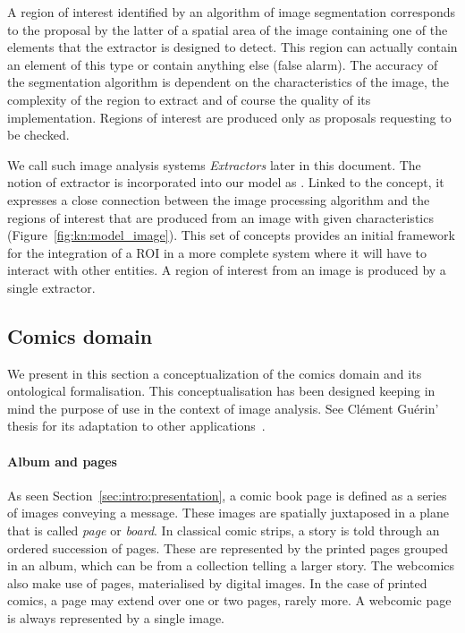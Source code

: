 A region of interest identified by an algorithm of image segmentation corresponds to the proposal by the latter of a spatial area of the image containing one of the elements that the extractor is designed to detect.
This region can actually contain an element of this type or contain anything else (false alarm).
The accuracy of the segmentation algorithm is dependent on the characteristics of the image, the complexity of the region to extract and of course the quality of its implementation.
Regions of interest are produced only as proposals requesting to be checked.

We call such image analysis systems \textit{Extractors} later in this document.
The notion of extractor is incorporated into our model as .
Linked to the  concept, it expresses a close connection between the image processing algorithm and the regions of interest that are produced from an image with given characteristics (Figure~\ref{fig:kn:model_image}).
This set of concepts provides an initial framework for the integration of a ROI in a more complete system where it will have to interact with other entities.
A region of interest from an image is produced by a single extractor.


\subsection{Comics domain} %
\label{sub:kn:comics_domain}

We present in this section a conceptualization of the comics domain and its ontological formalisation.
This conceptualisation has been designed keeping in mind the purpose of use in the context of image analysis.
See Cl{\'e}ment Gu{\'e}rin' thesis for its adaptation to other applications~\cite{phdthesisGuerin14}.

\paragraph{Album and pages} %
\label{par:album_and_pages}

As seen Section~\ref{sec:intro:presentation}, a comic book page is defined as a series of images conveying a message.
These images are spatially juxtaposed in a plane that is called \emph{page} or \emph{board}.
In classical comic strips, a story is told through an ordered succession of pages.
These are represented by the printed pages grouped in an album, which can be from a  collection telling a larger story.
The webcomics also make use of pages, materialised by digital images.
In the case of printed comics, a page may extend over one or two pages, rarely more.
A webcomic page is always represented by a single image.

